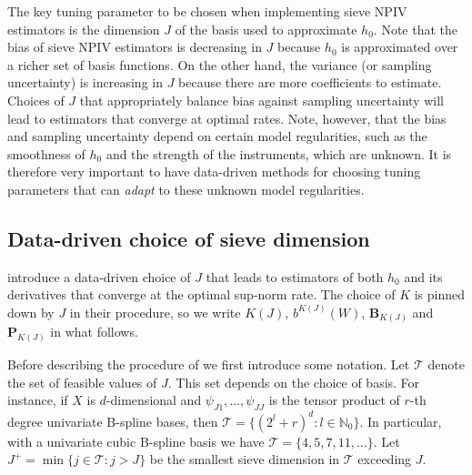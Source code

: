 \documentclass[
]{jss}
\begin{document}
The key tuning parameter to be chosen when implementing sieve NPIV
estimators is the dimension \(J\) of the basis used to approximate
\(h_0\). Note that the bias of sieve NPIV estimators is decreasing in
\(J\) because \(h_0\) is approximated over a richer set of basis
functions. On the other hand, the variance (or sampling uncertainty) is
increasing in \(J\) because there are more coefficients to estimate.
Choices of \(J\) that appropriately balance bias against sampling
uncertainty will lead to estimators that converge at optimal rates.
Note, however, that the bias and sampling uncertainty depend on certain
model regularities, such as the smoothness of \(h_0\) and the strength
of the instruments, which are unknown. It is therefore very important to
have data-driven methods for choosing tuning parameters that can
\emph{adapt} to these unknown model regularities.

\hypertarget{data-driven-choice-of-sieve-dimension}{%
\subsection{Data-driven choice of sieve
dimension}\label{data-driven-choice-of-sieve-dimension}}

\citet{CCK} introduce a data-driven choice of \(J\) that leads to
estimators of both \(h_0\) and its derivatives that converge at the
optimal sup-norm rate. The choice of \(K\) is pinned down by \(J\) in
their procedure, so we write \(K(J)\), \(b^{K(J)}(W)\),
\(\mathbf B_{K(J)}\) and \(\mathbf P_{K(J)}\) in what follows.

Before describing the procedure of \citet{CCK} we first introduce some
notation. Let \(\mathcal T\) denote the set of feasible values of \(J\).
This set depends on the choice of basis. For instance, if \(X\) is
\(d\)-dimensional and \(\psi_{J1},\ldots,\psi_{JJ}\) is the tensor
product of \(r\)-th degree univariate B-spline bases, then
\(\mathcal T = \{(2^l + r)^d : l \in \mathbb N_0 \}\). In particular,
with a univariate cubic B-spline basis we have
\(\mathcal T = \{4,5,7, 11, ...\}\). Let
\(J^+ = \min\{j \in \mathcal T : j > J\}\) be the smallest sieve
dimension in \(\mathcal T\) exceeding \(J\).
\end{document}
